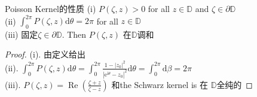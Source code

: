 \documentclass[cn,11pt,chinese,black]{elegantbook}
\begin{document}
\begin{corollary}{Poisson Kernel的性质}
(i) $P(\zeta, z)>0$ for all $z \in \mathbb{D}$ and $\zeta \in \partial \mathbb{D}$\\
(ii) $\int_{0}^{2 \pi} P(\zeta, z) \mathrm{d} \theta=2 \pi$ for all $z \in \mathbb{D}$\\
(iii) 固定$\zeta \in \partial \mathbb{D} .$ Then $P(\zeta, z)$ 在$\mathbb{D}$调和
\end{corollary}
\begin{proof}
(i). 由定义给出\\
(ii). $\int_{0}^{2 \pi} P(\zeta, z) \mathrm{d} \theta=\int_{0}^{2 \pi} \frac{1-\left|z_{0}\right|^{2}}{\left|\mathrm{e}^{\mathrm{i} \theta}-z_{0}\right|^{2}} \mathrm{d} \theta=\int_{0}^{2 \pi} \mathrm{d} \beta=2 \pi$\\
(iii). $P(\zeta, z)=\operatorname{Re}\left(\frac{\zeta+z}{\zeta-z}\right)$ 和the Schwarz kernel is 在 $\mathbb{D}$全纯的
\end{proof}
\end{document}
